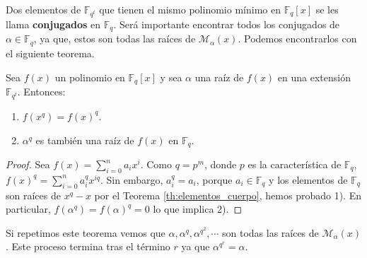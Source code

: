 Dos elementos de $\mathbb{F}_{q^t}$ que tienen el mismo polinomio mínimo en $\mathbb{F}_{q}[x]$ se les llama \textbf{conjugados} en $\mathbb{F}_{q}$. Será importante encontrar todos los conjugados de $\alpha \in \mathbb{F}_{q}$, ya que, estos son todas las raíces de $\mathcal{M}_\alpha(x)$. Podemos encontrarlos con el siguiente teorema.

\begin{theorem}
Sea $f(x)$ un polinomio en $\mathbb{F}_{q}[x]$ y sea $\alpha$ una raíz de $f(x)$ en una extensión $\mathbb{F}_{q^t}$. Entonces:
\begin{enumerate}
	\item $f(x^q) = f(x)^q$.
	\item $\alpha^q$ es también una raíz de $f(x)$ en $\mathbb{F}_{q}$.
\end{enumerate}
\end{theorem}

\begin{proof}
Sea $f(x) = \sum_{i=0}^n a_ix^i$. Como $q = p^m$, donde $p$ es la característica de $\mathbb{F}_{q}$, $f(x)^q = \sum_{i=0}^n a_i^qx^{iq}$. Sin embargo, $a_i^q = a_i$, porque $a_i \in \mathbb{F}_{q}$ y los elementos de $\mathbb{F}_{q}$ son raíces de $x^q-x$ por el Teorema \ref{th:elementos_cuerpo}, hemos probado 1). En particular, $f(\alpha^q) = f(\alpha)^q = 0 $ lo que implica 2). 
\end{proof}

Si repetimos este teorema vemos que $\alpha,\alpha^q,\alpha^{q^2},\cdots $ son todas las raíces de $\mathcal{M}_\alpha(x)$. Este proceso termina tras el término $r$ ya que $\alpha^{q^r} = \alpha$.

